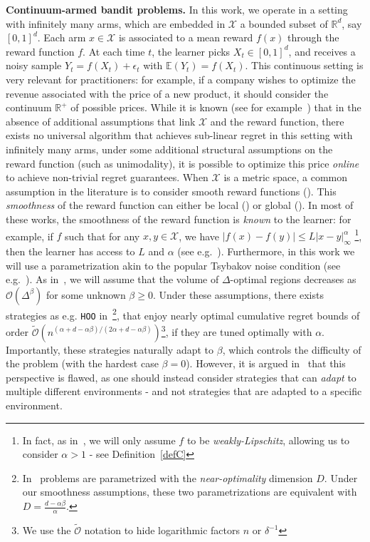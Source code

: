 \documentclass[final,12pt]{colt2018}
\newcommand{\bigO}[1]{\mathcal O\left( #1 \right)}
\newcommand{\tildeO}[1]{\tilde{\mathcal O}\left( #1 \right)}
\begin{document}
\noindent\textbf{Continuum-armed bandit problems.} In this work, we operate in a setting with infinitely many arms, which are embedded in $\mathcal X$ a bounded subset of $\mathbb R^d$, say $[0,1]^d$. Each arm $x \in \mathcal X$ is associated to a mean reward $f(x)$ through the reward function $f$. At each time $t$, the learner picks $X_t \in [0,1]^d$, and receives a noisy sample $Y_t = f(X_t) + \epsilon_t$ with $\mathbb E(Y_t) = f(X_t)$. This continuous setting is very relevant for practitioners: for example, if a company wishes to optimize the revenue associated with the price of a new product, it should consider the continuum $\mathbb R^+$ of possible prices. While it is known (see for example~\cite{bubeck2011pure}) that in the absence of additional assumptions that link $\mathcal X$ and the reward function, there exists no universal algorithm that achieves sub-linear regret in this setting with infinitely many arms, under some additional structural assumptions on the reward function (such as unimodality), it is possible to optimize this price \emph{online} to achieve non-trivial regret guarantees. When $\mathcal X$ is a metric space, a common assumption in the literature is to consider smooth reward functions (\cite{agrawal1995continuum, kleinberg2004a}). This \emph{smoothness} of the reward function can either be local (\cite{auer2007improved,grill2015black}) or global (\cite{kleinberg2008multi,cope2009regret,bubeck2011x,minsker2013estimation}). In most of these works, the smoothness of the reward function is \emph{known} to the learner: for example, if $f$ such that for any $x,y \in \mathcal X$, we have $|f(x) - f(y)| \leq L|x-y|_\infty^\alpha$ \footnote{In fact, as in~\cite{bubeck2011pure}, we will only assume $f$ to be \emph{weakly-Lipschitz}, allowing us to consider $\alpha > 1$ - see Definition~\ref{defC}}, then the learner has access to $L$ and $\alpha$ (see e.g.~\cite{auer2007improved,bubeck2011x}). Furthermore, in this work we will use a parametrization akin to the popular Tsybakov noise condition (see e.g.~\cite{tsybakov2004optimal,audibert2007fast}). As in~\cite{auer2007improved,minsker2013estimation}, we will assume that the volume of $\Delta$-optimal regions decreases as $\bigO{\Delta^\beta}$ for some unknown $\beta \geq 0$. Under these assumptions, there exists strategies as e.g. \texttt{HOO} in~\cite{bubeck2011x}\footnote{In~\cite{bubeck2011x} problems are parametrized with the \emph{near-optimality} dimension $D$. Under our smoothness assumptions, these two parametrizations are equivalent with $D = \frac{d-\alpha\beta}{\alpha}$.}, that enjoy nearly optimal cumulative regret bounds of order $\tildeO{n^{(\alpha+d-\alpha\beta)/(2\alpha+d-\alpha\beta)}}$\footnote{We use the $\tilde{\mathcal O}$ notation to hide logarithmic factors $n$ or $\delta^{-1}$}, if they are tuned optimally with $\alpha$. Importantly, these strategies naturally adapt to $\beta$, which controls the difficulty of the problem (with the hardest case $\beta = 0$). However, it is argued in~\cite{bubeck2011lipschitz} that this perspective is flawed, as one should instead consider strategies that can \emph{adapt} to multiple different environments - and not strategies that are adapted to a specific environment.\\
\end{document}
